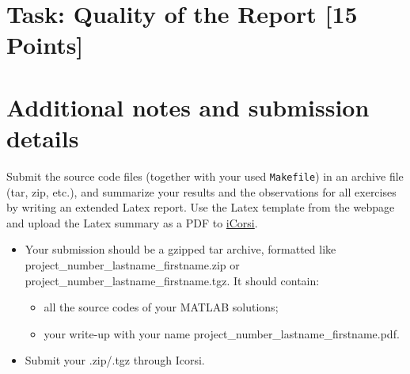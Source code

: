 \documentclass[unicode,11pt,a4paper,oneside,numbers=endperiod,openany]{scrartcl}
\begin{document}

\section{Task: Quality of the Report [15 Points] }


\section*{Additional notes and submission details}
Submit the source code files (together with your used \texttt{Makefile}) in
an archive file (tar, zip, etc.), and summarize your results and the
observations for all exercises by writing an extended Latex report.
Use the Latex template from the webpage and upload the Latex summary
as a PDF to \href{https://www.icorsi.ch/course/view.php?id=14652}{iCorsi}.

\begin{itemize}
	\item Your submission should be a gzipped tar archive, formatted like project\_number\_lastname\_firstname.zip or project\_number\_lastname\_firstname.tgz. 
	It should contain:
	\begin{itemize}
		\item all the source codes of your MATLAB solutions;
		\item your write-up with your name  project\_number\_lastname\_firstname.pdf.
	\end{itemize}
	\item Submit your .zip/.tgz through Icorsi.
\end{itemize}
\end{document}
